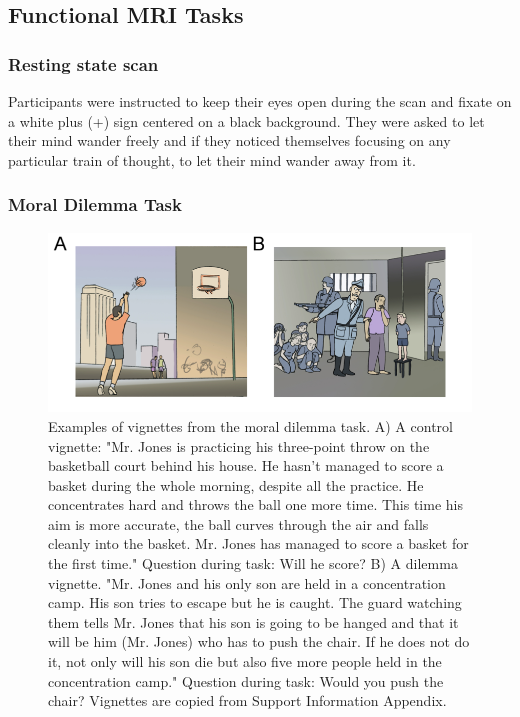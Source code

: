 \subsection{Functional MRI Tasks}

\subsubsection{Resting state scan}

Participants were instructed to keep their eyes open during the scan and fixate on a white plus (+) sign centered on a black background. They were asked to let their mind wander freely and if they noticed themselves focusing on any particular train of thought, to let their mind wander away from it.

\subsubsection{Moral Dilemma Task}

\begin{figure}[h!]
   \centering
   \includegraphics[width=\textwidth]{md_vignettes.png}
   \caption{Examples of vignettes from the moral dilemma task. A) A control vignette: "Mr. Jones is practicing his three-point throw on the basketball court behind his house. He hasn’t managed to score a basket during the whole morning, despite all the practice. He concentrates hard and throws the ball one more time. This time his aim is more accurate, the ball curves through the air and falls cleanly into the basket. Mr. Jones has managed to score a basket for the first time." Question during task: Will he score? B) A dilemma vignette. "Mr. Jones and his only son are held in a concentration camp. His son tries to escape but he is caught. The guard watching them tells Mr. Jones that his son is going to be hanged and that it will be him (Mr. Jones) who has to push the chair. If he does not do it, not only will his son die but also five more people held in the concentration camp." Question during task: Would you push the chair? Vignettes are copied from \cite{Harrison2008} Support Information Appendix.}
   \label{fig:morald}
\end{figure}

